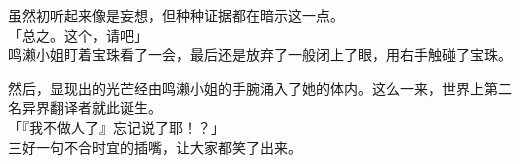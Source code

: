虽然初听起来像是妄想，但种种证据都在暗示这一点。\\

「总之。这个，请吧」\\

鸣濑小姐盯着宝珠看了一会，最后还是放弃了一般闭上了眼，用右手触碰了宝珠。

然后，显现出的光芒经由鸣濑小姐的手腕涌入了她的体内。这么一来，世界上第二名异界翻译者就此诞生。\\

「『我不做人了』忘记说了耶！？」\\

三好一句不合时宜的插嘴，让大家都笑了出来。\\
